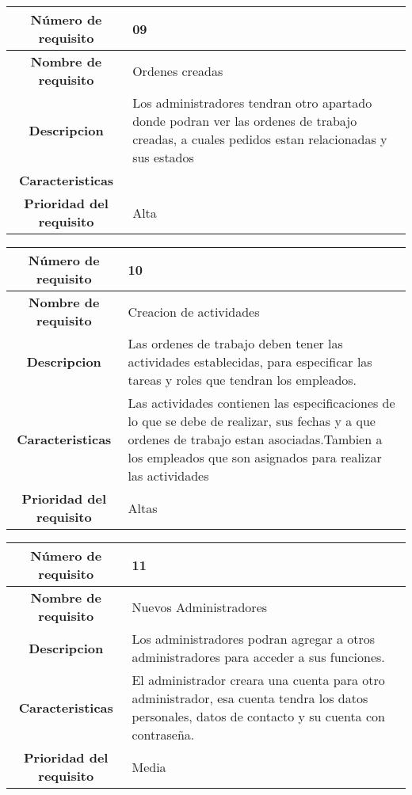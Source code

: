 \documentclass[12pt,a4paper, twosite]{article}
\begin{document}
\begin{center}
    \begin{tabular}{|c|p{6cm}|}
        \hline
        \textbf{Número de requisito} & 09 \\ 
        \hline
        \textbf{Nombre de requisito} & Ordenes creadas  \\
        \hline
        \textbf{Descripcion} & Los administradores tendran otro apartado donde podran ver las ordenes de trabajo creadas, a cuales pedidos estan relacionadas y sus estados \\
        \hline
        \textbf{Caracteristicas} &  \\
        \hline
        \textbf{Prioridad del requisito} & Alta \\
        \hline
     \end{tabular}
\end{center}

\begin{center}
    \begin{tabular}{|c|p{6cm}|}
        \hline
        \textbf{Número de requisito} & 10 \\ 
        \hline
        \textbf{Nombre de requisito} & Creacion de actividades \\
        \hline
        \textbf{Descripcion} & Las ordenes de trabajo deben tener las actividades establecidas, para especificar las tareas y roles que tendran los empleados. \\
        \hline
        \textbf{Caracteristicas} & Las actividades contienen las especificaciones de lo que se debe de realizar, sus fechas y a que ordenes de trabajo estan asociadas.Tambien a los empleados que son asignados para realizar las actividades \\
        \hline
        \textbf{Prioridad del requisito} & Altas  \\
        \hline
     \end{tabular}
\end{center}

\begin{center}
    \begin{tabular}{|c|p{6cm}|}
        \hline
        \textbf{Número de requisito} & 11 \\ 
        \hline
        \textbf{Nombre de requisito} & Nuevos Administradores \\
        \hline
        \textbf{Descripcion} & Los administradores podran agregar a otros administradores para acceder a sus funciones. \\
        \hline
        \textbf{Caracteristicas} & El administrador creara una cuenta para otro administrador, esa cuenta tendra los datos personales, datos de contacto y su cuenta con contraseña. \\
        \hline
        \textbf{Prioridad del requisito} & Media \\
        \hline
     \end{tabular}
\end{center}
\end{document}
